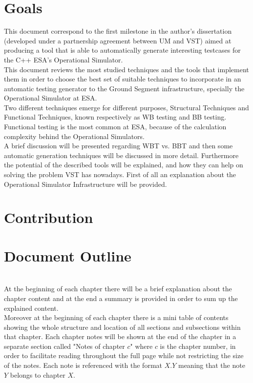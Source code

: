 \section{Goals}
This document correspond to the first milestone in the author's dissertation (developed under a partnership agreement between \ac{UM} and \ac{VST}) aimed at producing a tool
that is able to automatically generate interesting testcases for the C++ \ac{ESA}'s Operational Simulator.\\
This document reviews the most studied techniques
and the tools that implement them in order to choose the best set of
suitable techniques to incorporate in an automatic
testing generator to the Ground Segment infrastructure, specially the
Operational Simulator at \ac{ESA}.\\
Two different techniques emerge for different purposes, Structural
Techniques and Functional Techniques,
known respectively as \ac{WB}\cite{stt} testing and \ac{BB}\cite{black} testing.
Functional testing is the most common at \ac{ESA}, because of the
calculation complexity behind the Operational Simulators.\\
A brief discussion will be presented regarding \ac{WBT} vs. \ac{BBT}
and then some automatic generation techniques will be discussed in more detail.
Furthermore the potential of the described tools will be explained, and how they can help
on solving the problem \ac{VST} has nowadays. First of all an explanation about the Operational Simulator Infrastructure will be provided.

\section{Contribution}
\section{Document Outline}
\\
At the beginning of each chapter there will be a brief explanation about the chapter content and at
the end a summary is provided in order to sum up the explained content.\\

Moreover at the beginning of each chapter there is a mini table
of contents showing the whole structure and location of all sections and subsections within that chapter.
Each chapter notes will be shown at the end of the chapter in a separate section called "Notes of chapter $c$" where $c$ is the chapter number,
in order to facilitate reading throughout the full page while not restricting the size of the notes.
Each note is referenced with the format $X.Y$ meaning that
the note $Y$ belongs to chapter $X$.
\secendnote
